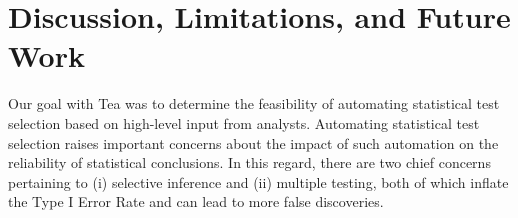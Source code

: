 


\vspace*{-0.5cm}








\section{Discussion, Limitations, and Future Work} \label{sec:discussionTea} 

Our goal with Tea was to determine the feasibility of automating statistical
test selection based on high-level input from analysts. Automating statistical
test selection raises important concerns about the impact of such automation on
the reliability of statistical conclusions. In this regard, there are two chief
concerns pertaining to (i) selective inference and (ii) multiple testing, both
of which inflate the Type I Error Rate and can lead to more false discoveries. 

